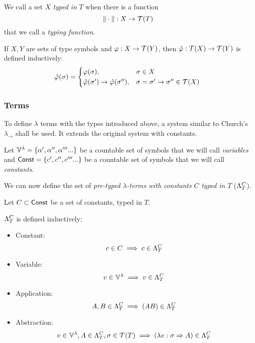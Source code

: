 \documentclass[main.tex]{subfiles}
\begin{document}
\begin{defn}
    We call a set $X$ \emph{typed in} $T$ when there is a function
    \[ \typeoff : X \rightarrow \tclos{T} \]
    that we call a \emph{typing function}.
\end{defn}

\begin{defn}
    If $X, Y$ are sets of type symbols and $\varphi: X \rightarrow \tclos{Y}$,
    then $\hat{\varphi} : \tclos{X} \rightarrow \tclos{Y}$ is defined inductively:
    \begin{equation*}
        \hat{\varphi}(\sigma) =
        \begin{cases*}
            \varphi(\sigma) ,& $\sigma \in X$ \\
            \hat{\varphi}(\sigma') \rightarrow \hat{\varphi}(\sigma'') ,&
                $\sigma = \sigma' \rightarrow \sigma'' \in \tclos{X}$ \\
        \end{cases*}
    \end{equation*}
\end{defn}

\subsubsection{Terms}
To define $\lambda$ terms with the types introduced above, a system similar
to Church's $\lambda_\rightarrow$ \cite[chap.~2.4]{ttfp} shall be used. It
extends the original system with constants.

Let $\lvars = \{ \alpha', \alpha'', \alpha''' ... \}$ be a countable set of symbols
that we will call \emph{variables} and $\const = \{ c', c'', c''' ... \}$ be a countable
set of symbols that we will call \emph{constants}.

We can now define the set of
\emph{pre-typed $\lambda$-terms with constants $C$ typed in $T$} ($\plambda{T}{C}$).

\begin{defn}
    \label{def:lambdaterm}
    Let $C \subset \const$ be a set of constants, typed in $T$.

    $\plambda{T}{C}$ is defined inductively:
    \begin{itemize}
        \item Constant:    \[ c \in C \implies c \in \plambda{T}{C} \]
        \item Variable:    \[ v \in \lvars \implies v \in \plambda{T}{C} \]
        \item Application: \[ A, B \in \plambda{T}{C} \implies (AB) \in \plambda{T}{C} \]
        \item Abstraction: \[ v \in \lvars, A \in \plambda{T}{C}, \sigma \in \tclos{T}
                \implies (\lambda v : \sigma \abstr A) \in \plambda{T}{C} \]
    \end{itemize}
\end{defn}
\end{document}

